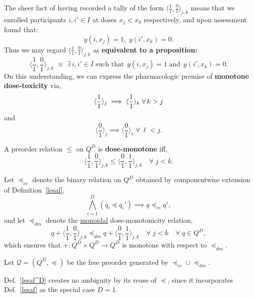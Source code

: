 \documentclass{article}
\newcommand{\Q}{\ensuremath{\mathcal{Q}}}
\begin{document}
\begin{nota}
  The sheer fact of having recorded a tally of the form $\langle\frac{1}{1},\frac{0}{1}\rangle_{j,k}$ means that we enrolled participants $i, i' \in I$ at doses $x_j < x_k$ respectively, and upon assessment found that:
  $$
  y(i,x_j) = 1, \; y(i',x_k) = 0.
  $$
  Thus we may regard $\langle\frac{1}{1},\frac{0}{1}\rangle_{j,k}$ as \textbf{equivalent to a proposition:}
  $$
  \langle\frac{1}{1},\frac{0}{1}\rangle_{j,k} \; \equiv \; \exists\, i, i' \in I \;\mbox{such that}\;\, y(i,x_j) = 1 \;\mbox{and}\;\, y(i',x_k) = 0.
  $$
  On this understanding, we can express the pharmacologic premise of \textbf{monotone dose-toxicity} via,
  $$
  \langle\frac{1}{1}\rangle_j \implies \langle\frac{1}{1}\rangle_k \;\forall\, k > j \\
  $$
  and
  $$
  \langle\frac{0}{1}\rangle_j \implies \langle\frac{0}{1}\rangle_\ell \;\forall\, \ell < j.
  $$
\end{nota}

\begin{defn}\label{domon}
  A preorder relation $\le$ on $Q^D$ is \textbf{dose-monotone} iff,
  $$
  \langle\frac{1}{1},\frac{0}{1}\rangle_{j,k} \le \langle\frac{0}{1},\frac{1}{1}\rangle_{j,k} \quad \forall \; j < k.
  $$
\end{defn}

\begin{nota}
  Let $\preceq_{ce}$ denote the binary relation on $Q^D$ obtained by componentwise extension of Definition~\ref{lesaf},
  $$
  \bigwedge_{i=1}^D (q_i \preceq q_i') \implies q \preceq_{ce} q',
  $$
  and let $\preceq_{dm}$ denote the \underline{monoidal} dose-monotonicity relation,
  \begin{equation}
  q + \langle\frac{1}{1},\frac{0}{1}\rangle_{j,k} \preceq_{dm} q + \langle\frac{0}{1},\frac{1}{1}\rangle_{j,k} \quad \forall\; j < k \quad \forall\; q \in Q^D, \label{xchg}
  \end{equation}
  which ensures that $+ : Q^D \times Q^D \rightarrow Q^D$ is monotone with respect to $\preceq_{dm}$.
\end{nota}

\begin{defn}\label{lesaf^D}
  Let $\Q = (Q^D,\preceq)$ be the free preorder generated by $\preceq_{ce} \cup \preceq_{dm}$.
\end{defn}

\begin{fact}
  Def.~\ref{lesaf^D} creates no ambiguity by its reuse of $\preceq$, since it incorporates Def.~\ref{lesaf} as the special case $D=1$.
\end{fact}
\end{document}

